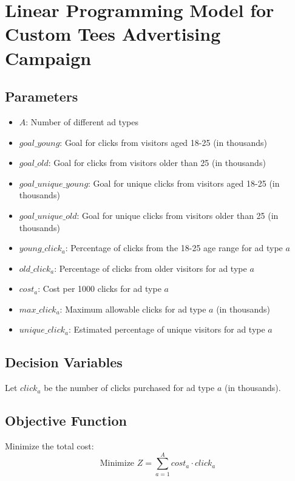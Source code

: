 \documentclass{article}
\begin{document}
\section*{Linear Programming Model for Custom Tees Advertising Campaign}

\subsection*{Parameters}
\begin{itemize}
    \item $A$: Number of different ad types
    \item $goal\_young$: Goal for clicks from visitors aged 18-25 (in thousands)
    \item $goal\_old$: Goal for clicks from visitors older than 25 (in thousands)
    \item $goal\_unique\_young$: Goal for unique clicks from visitors aged 18-25 (in thousands)
    \item $goal\_unique\_old$: Goal for unique clicks from visitors older than 25 (in thousands)
    \item $young\_click_a$: Percentage of clicks from the 18-25 age range for ad type $a$
    \item $old\_click_a$: Percentage of clicks from older visitors for ad type $a$
    \item $cost_a$: Cost per 1000 clicks for ad type $a$
    \item $max\_click_a$: Maximum allowable clicks for ad type $a$ (in thousands)
    \item $unique\_click_a$: Estimated percentage of unique visitors for ad type $a$
\end{itemize}

\subsection*{Decision Variables}
Let $click_a$ be the number of clicks purchased for ad type $a$ (in thousands).

\subsection*{Objective Function}
Minimize the total cost:
\[
\text{Minimize } Z = \sum_{a=1}^{A} cost_a \cdot click_a
\]
\end{document}
